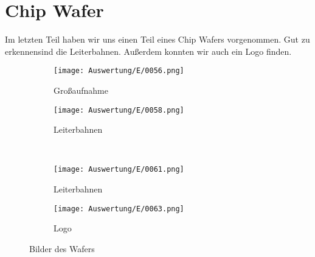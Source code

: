 \newpage
\section{Chip Wafer}

Im letzten Teil haben wir uns einen Teil eines Chip Wafers vorgenommen. Gut zu erkennensind die Leiterbahnen. Außerdem konnten wir auch ein Logo finden.

\begin{figure}[h]
    \centering
    
    \begin{subfigure}[b]{0.45\textwidth}
        \centering
        \texttt{[image: Auswertung/E/0056.png]}
        \caption{Großaufnahme}
    \end{subfigure}
    \hfill
    \begin{subfigure}[b]{0.45\textwidth}
        \centering
        \texttt{[image: Auswertung/E/0058.png]}
        \caption{Leiterbahnen}
    \end{subfigure}
    \\
    \begin{subfigure}[b]{0.45\textwidth}
        \centering
        \texttt{[image: Auswertung/E/0061.png]}
        \caption{Leiterbahnen}
    \end{subfigure}
    \hfill
    \begin{subfigure}[b]{0.45\textwidth}
        \centering
        \texttt{[image: Auswertung/E/0063.png]}
        \caption{Logo}
    \end{subfigure}
    \caption{Bilder des Wafers}
\end{figure}